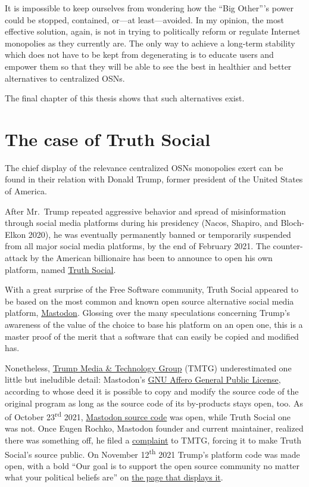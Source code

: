 \documentclass[
  a4paper,
]{book}
\begin{document}
It is impossible to keep ourselves from wondering how the ``Big Other'''s power could be stopped, contained, or---at least---avoided. In my opinion, the most effective solution, again, is not in trying to politically reform or regulate Internet monopolies as they currently are. The only way to achieve a long-term stability which does not have to be kept from degenerating is to educate users and empower them so that they will be able to see the best in healthier and better alternatives to centralized OSNs.

The final chapter of this thesis shows that such alternatives exist.

\hypertarget{the-case-of-truth-social}{%
\section{The case of Truth Social}\label{the-case-of-truth-social}}

The chief display of the relevance centralized OSNs monopolies exert can be found in their relation with Donald Trump, former president of the United States of America.

After Mr.~Trump repeated aggressive behavior and spread of misinformation through social media platforms during his presidency {(Nacos, Shapiro, and Bloch-Elkon 2020)}, he was eventually permanently banned or temporarily suspended from all major social media platforms, by the end of February 2021. The counter-attack by the American billionaire has been to announce to open his own platform, named \href{https://truthsocial.com}{Truth Social}.

With a great surprise of the Free Software community, Truth Social appeared to be based on the most common and known open source alternative social media platform, \href{https://joinmastodon.org}{Mastodon}. Glossing over the many speculations concerning Trump's awareness of the value of the choice to base his platform on an open one, this is a master proof of the merit that a software that can easily be copied and modified has.

Nonetheless, \href{https://www.tmtgcorp.com/}{Trump Media \& Technology Group} (TMTG) underestimated one little but ineludible detail: Mastodon's \href{https://www.gnu.org/licenses/agpl-3.0.en.html}{GNU Affero General Public License}, according to whose deed it is possible to copy and modify the source code of the original program as long as the source code of its by-products stays open, too. As of October 23\textsuperscript{rd} 2021, \href{https://github.com/mastodon/mastodon}{Mastodon source code} was open, while Truth Social one was not. Once Eugen Rochko, Mastodon founder and current maintainer, realized there was something off, he filed a \href{https://blog.joinmastodon.org/2021/10/trumps-new-social-media-platform-found-using-mastodon-code/}{complaint} to TMTG, forcing it to make Truth Social's source public. On November 12\textsuperscript{th} 2021 Trump's platform code was made open, with a bold ``Our goal is to support the open source community no matter what your political beliefs are'' on \href{https://truthsocial.com/open-source}{the page that displays it}.
\end{document}
